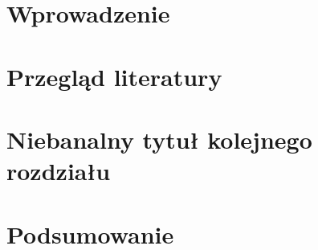 \chapter{Wprowadzenie}


\chapter{Przegląd literatury}

%

\chapter{Niebanalny tytuł kolejnego rozdziału}


\chapter{Podsumowanie}
\label{ch:podsumowanie}

